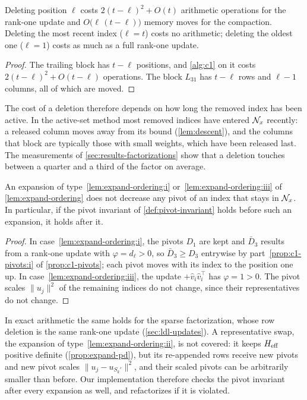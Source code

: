 \begin{prop} \label{prop:delete-cost}
Deleting position $\ell$ costs $2(t-\ell)^2 + O(t)$ arithmetic operations for the rank-one update
and $O\bigl(\ell\,(t-\ell)\bigr)$ memory moves for the compaction. Deleting the most recent index
($\ell = t$) costs no arithmetic; deleting the oldest one ($\ell = 1$) costs as much as a full
rank-one update.
\end{prop}

\begin{proof}
The trailing block has $t-\ell$ positions, and \cref{alg:c1} on it costs $2(t-\ell)^2 + O(t-\ell)$
operations. The block $L_{31}$ has $t-\ell$ rows and $\ell-1$ columns, all of which are moved.
\end{proof}

The cost of a deletion therefore depends on how long the removed index has been active. In the
active-set method most removed indices have entered $\mathcal{N}_x$ recently: a released column moves
away from its bound (\cref{lem:descent}), and the columns that block are typically those with
small weights, which have been released last. The measurements of
\cref{sec:results-factorizations} show that a deletion touches between a quarter and a third of the factor on
average.

\begin{cor} \label{cor:expand-pivots}
An expansion of type~\ref{lem:expand-ordering:i} or~\ref{lem:expand-ordering:iii} of \cref{lem:expand-ordering} does not decrease any pivot of
an index that stays in $\mathcal{N}_x$. In particular, if the pivot invariant of
\cref{def:pivot-invariant} holds before such an expansion, it holds after it.
\end{cor}

\begin{proof}
In case~\ref{lem:expand-ordering:i}, the pivots $D_1$ are kept and $\bar D_3$ results from a rank-one update with
$\varphi = d_\ell>0$, so $\bar D_3\ge D_3$ entrywise by part~\ref{prop:c1-pivots:i} of \cref{prop:c1-pivots}; each pivot
moves with its index to the position one up. In case~\ref{lem:expand-ordering:iii}, the update $+\hat v_i\hat v_i^\top$ has
$\varphi = 1>0$. The pivot scales $\lVert u_j\rVert^2$ of the remaining indices do not change, since
their representatives do not change.
\end{proof}

In exact arithmetic the same holds for the sparse factorization, whose row deletion is the same
rank-one update (\cref{sec:ldl-updates}). A representative swap, the expansion of
type~\ref{lem:expand-ordering:ii}, is not covered: it keeps $H_{\mathrm{eff}}$ positive definite
(\cref{prop:expand-pd}), but its re-appended rows receive new pivots and new pivot scales
$\lVert u_j - u_{S_k'}\rVert^2$, and their scaled pivots can be arbitrarily smaller than before.
Our implementation therefore checks the pivot invariant after every expansion as well, and
refactorizes if it is violated.


